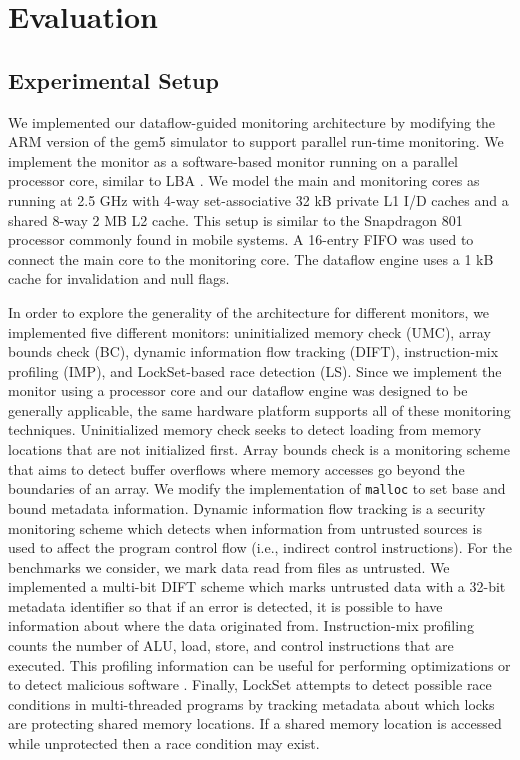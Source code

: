 \section{Evaluation}
\label{sec:monitoring_dift_drop.evaluation}

\subsection{Experimental Setup}
\label{sec:monitoring_dift_drop.evaluation.setup}

We implemented our dataflow-guided monitoring architecture by modifying the ARM
version of the gem5 simulator \cite{gem5} to support parallel run-time
monitoring. We implement the monitor as a software-based monitor running on a
parallel processor core, similar to LBA \cite{lba-asid06}.  We model the main
and monitoring cores as running at 2.5 GHz with 4-way set-associative 32 kB
private L1 I/D caches and a shared 8-way 2 MB L2 cache. This setup is similar
to the Snapdragon 801 processor commonly found in mobile systems. A 16-entry
FIFO was used to connect the main core to the monitoring core. The dataflow
engine uses a 1 kB cache for invalidation and null flags.

In order to explore the generality of the architecture for different monitors,
we implemented five different monitors: uninitialized memory check (UMC), array
bounds check (BC), dynamic information flow tracking (DIFT), instruction-mix
profiling (IMP), and LockSet-based race detection (LS).  Since we implement the
monitor using a processor core and our dataflow engine was designed to be
generally applicable, the same hardware platform supports all of these
monitoring techniques.  Uninitialized memory check seeks to detect loading from
memory locations that are not initialized first. Array bounds check is a monitoring
scheme that aims to detect buffer overflows where memory accesses go beyond the
boundaries of an array. We modify the implementation of {\tt malloc} to set
base and bound metadata information. Dynamic information flow tracking is a
security monitoring scheme which detects when information from untrusted
sources is used to affect the program control flow (i.e., indirect control
instructions). For the benchmarks we consider, we mark data read from files as
untrusted. We implemented a multi-bit DIFT scheme which marks untrusted data
with a 32-bit metadata identifier so that if an error is detected, it is
possible to have information about where the data originated from.
Instruction-mix profiling counts the number of ALU, load, store, and control
instructions that are executed. This profiling information can be useful for
performing optimizations or to detect malicious software \cite{tang-raid14}.
Finally, LockSet \cite{eraser-tocs97} attempts to detect possible race conditions in
multi-threaded programs by tracking metadata about which locks are protecting
shared memory locations. If a shared memory location is accessed while
unprotected then a race condition may exist.

